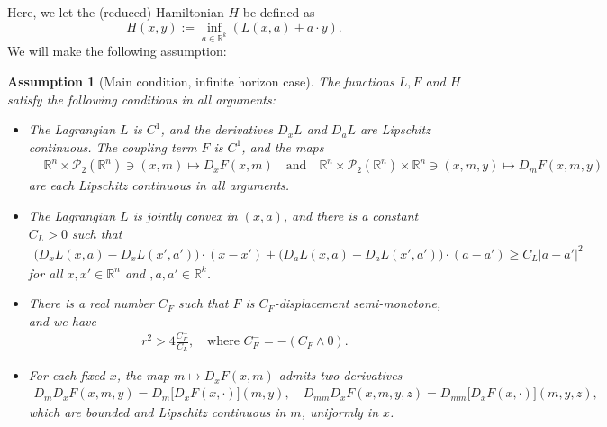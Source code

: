 \documentclass[11pt,reqno]{amsart}
\numberwithin{equation}{section}
\newtheorem{assumption}[theorem]{Assumption}
\theoremstyle{definition}
\def\R{{\mathbb R}}
\newcommand{\spt}{\mathcal{P}_2(\R^n)}
\def \R{\mathbb{R}}
\begin{document}
Here, we let the (reduced) Hamiltonian $H$ be defined as
\begin{equation}
  \label{eq.H.inf}
  H(x,y) := \inf_{a\in \R^k}(L(x,a) + a\cdot y).
\end{equation}
We will make the following assumption:
\begin{assumption}[Main condition, infinite horizon case] \label{assump:driftcontrolstruct.inf.T}
The functions $L, F$ and $H$ satisfy the following conditions in all arguments:
\begin{itemize}
    \item[(i)] The Lagrangian $L$ is $C^1$, and the derivatives $D_xL$ and $D_a L$ are Lipschitz continuous. The coupling term $F$ is $C^1$, and the maps 
\begin{align*}
&\R^n \times \spt \ni (x,m) \mapsto D_x F(x,m)
\quad\mathrm{and}\quad \R^n \times \spt \times \R^n \ni (x,m,y) \mapsto D_m F(x,m,y) %
\end{align*}
are each Lipschitz continuous in all arguments.
  \item[(ii)] The Lagrangian $L$ is jointly convex in $(x,a)$, and there is a constant $C_L > 0$ such that
\begin{align} \label{jointconvex.Tinf}
\big(D_x L(x,a) - D_x L(x',a')\big)\cdot(x - x') + \big(D_a L(x,a) - D_a L(x',a')\big)\cdot(a - a') \geq C_L |a - a'|^2
\end{align}
for all $x,x'\in \R^n$ and $,a,a' \in \R^k$. 
  \item[(iii)] There is a real number $C_{F}$ such that $F$ is $ C_{F}$-displacement semi-monotone, and we have
\begin{align} \label{convexmonotone.Tinf}
  r^2> 4\frac{C_F^-}{C_L}, \quad \text{where } C_F^- = - ( C_F \wedge 0).
\end{align} 
  \item[(iv)] For each fixed $x$, the map $m \mapsto D_x F(x,m)$ admits two derivatives 
\begin{align*}
D_m D_x F(x,m,y) = D_m\big[D_x F(x,\cdot)](m,y), \quad D_{mm} D_x F(x,m,y,z) = D_{mm} \big[D_x F(x,\cdot)\big](m,y,z), %
\end{align*}
which are bounded and Lipschitz continuous in $m$, uniformly in $x$.
\end{itemize}
\end{assumption}
\end{document}
